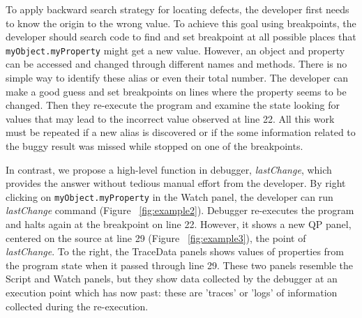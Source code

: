 \documentclass[preprint]{sigplanconf}
\begin{document}
To apply backward search strategy for locating defects, the developer
first needs to know the origin to the wrong value. To achieve this
goal using breakpoints, the developer should search code to find and
set breakpoint at all possible places that
\texttt{myObject.myProperty} might get a new value.  However, an
object and property can be accessed and changed through different
names and methods. There is no simple way to identify these alias or
even their total number.  The developer can make a good guess and set
breakpoints on lines where the property seems to be changed. Then they
re-execute the program and examine the state looking for values that
may lead to the incorrect value observed at line 22. All this work
must be repeated if a new alias is discovered or if the some
information related to the buggy result was missed while stopped on
one of the breakpoints.

In contrast, we propose a high-level function in debugger,
\textit{lastChange}, which provides the answer without tedious manual
effort from the developer. By right clicking on
\texttt{myObject.myProperty} in the Watch panel, the developer can run
\textit{lastChange} command (Figure ~\ref{fig:example2}). Debugger
re-executes the program and halts again at the breakpoint on line 22.
However, it shows a new QP panel, centered on the source at line 29
(Figure ~\ref{fig:example3}), the point of \textit{lastChange}.  To
the right, the TraceData panels shows values of properties from the
program state when it passed through line 29.  These two panels
resemble the Script and Watch panels, but they show data collected by
the debugger at an execution point which has now past: these are
'traces' or 'logs' of information collected during the re-execution.
\end{document}
